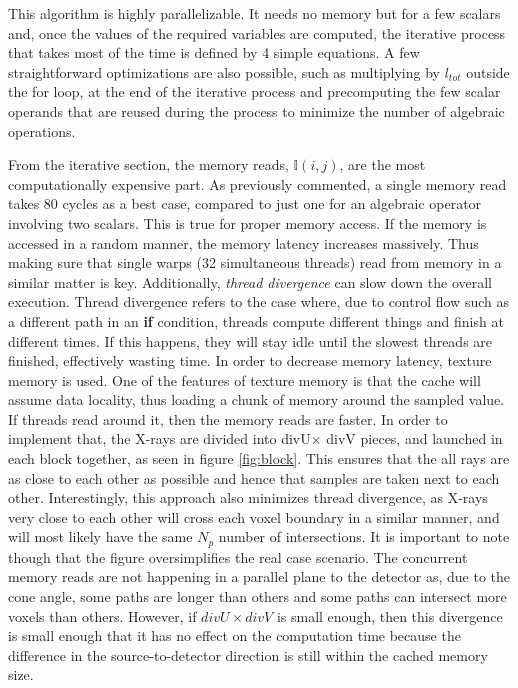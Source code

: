 

This algorithm is highly parallelizable. It needs no memory but for a few scalars and, once the values of the required variables are computed, the iterative process that takes most of the time is defined by 4 simple equations. A few straightforward optimizations are also possible, such as multiplying by $l_{tot}$ outside the for loop, at the end of the iterative process and precomputing the few scalar operands that are reused during the process to minimize the number of algebraic operations.




From the iterative section, the memory reads, $\mathbb{I}(i,j)$, are the most computationally expensive part. As previously commented, a single memory read takes 80 cycles as a best case, compared to just one for an algebraic operator involving two scalars. This is true for proper memory access. If the memory is accessed in a random manner, the memory latency increases massively. Thus making sure that single warps (32 simultaneous threads) read from memory in a similar matter is key. Additionally, \textit{thread divergence} can slow down the overall execution. Thread divergence refers to the case where, due to control flow such as a different path in an \textbf{if} condition, threads compute different things and finish at different times. If this happens, they will stay idle until the slowest threads are finished, effectively wasting time. In order to decrease memory latency, texture memory is used. One of the features of texture memory is that the cache will assume data locality, thus loading a chunk of memory around the sampled value. If threads read around it, then the memory reads are faster. In order to implement that, the X-rays are divided into divU$\times$ divV pieces, and launched in each block together, as seen in figure \ref{fig:block}. This ensures that the all rays are as close to each other as possible and hence that samples are taken next to each other. Interestingly, this approach also minimizes thread divergence, as X-rays very close to each other will cross each voxel boundary in a similar manner, and will most likely have the same $N_p$ number of intersections. It is important to note though that the figure oversimplifies the real case scenario. The concurrent memory reads are not happening in a parallel plane to the detector as, due to the cone angle, some paths are longer than others and some paths can intersect more voxels than others. However, if $divU\times divV$ is small enough, then this divergence is small enough that it has no effect on the computation time because the difference in the source-to-detector direction is still within the cached memory size.


